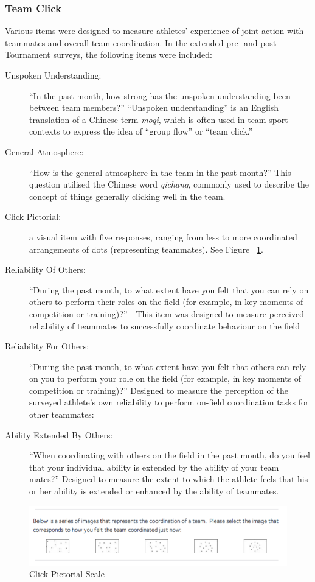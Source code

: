 \documentclass[12pt]{report}
\begin{document}
\subsubsection{Team Click}
Various items were designed to measure athletes' experience of joint-action with teammates and overall team coordination. In the extended pre- and post-Tournament surveys, the following items were included:
\begin{description}
  \item [Unspoken Understanding:] ``In the past month, how strong has the unspoken understanding been between team members?''  ``Unspoken understanding'' is an English translation of a Chinese term \textit{moqi}, which is often used in team sport contexts to express the idea of  ``group flow'' or ``team click.''
    \item [General Atmosphere:] ``How is the general atmosphere in the team in the past month?'' This question utilised the Chinese word \textit{qichang}, commonly used to describe the concept of things generally clicking well in the team.
  \item [Click Pictorial:] a visual item with five responses, ranging from less to more coordinated arrangements of dots (representing teammates). See Figure ~\ref{fig:clickPictorial}.
  \item [Reliability Of Others:] ``During the past month, to what extent have you felt that you can rely on others to perform their roles on the field (for example, in key moments of competition or training)?'' - This item was designed to measure perceived reliability of teammates to successfully coordinate behaviour on the field
  \item[Reliability For Others:] ``During the past month, to what extent have you felt that others can rely on you to perform your role on the field (for example, in key moments of competition or training)?'' Designed to measure the perception of the surveyed athlete's own reliability to perform on-field coordination tasks for other teammates:
  \item[Ability Extended By Others:] ``When coordinating with others on the field in the past month, do you feel that your individual ability is extended by the ability of your team mates?'' Designed to measure the extent to which the athlete feels that his or her ability is extended or enhanced by the ability of teammates.
\end{description}

\begin{figure}[htbp]
  \includegraphics[width = \linewidth]{../images/teamClickPictorial.png}
  \caption{Click Pictorial Scale}
  \label{fig:clickPictorial}
\end{figure}
\end{document}
